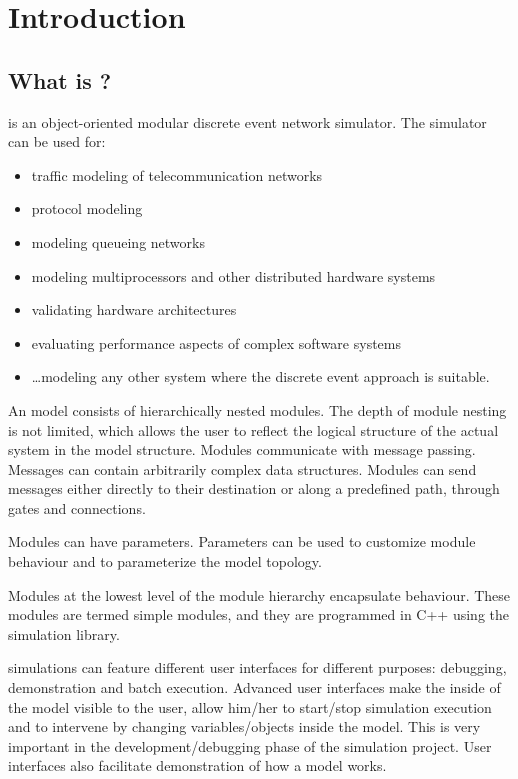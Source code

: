 \chapter{Introduction}
\label{cha:introduction}


\section{What is {\opp}?}

{\opp} is an object-oriented modular discrete event network simulator.
The simulator can be used for:

\begin{itemize}
  \item{traffic modeling of telecommunication networks}
  \item{protocol modeling}
  \item{modeling queueing networks}
  \item{modeling multiprocessors and other distributed hardware systems}
  \item{validating hardware architectures}
  \item{evaluating performance aspects of complex software systems}
  \item{\dots modeling any other system where the discrete event approach is
    suitable.}
\end{itemize}


An {\opp} model consists of hierarchically nested modules. The
depth of module nesting is not limited, which allows the user
to reflect the logical structure of the actual system in the
model structure. Modules communicate with message passing. Messages
can contain arbitrarily complex data structures. Modules can
send messages either directly to their destination or along a
predefined path, through gates and connections.


Modules can have parameters. Parameters can be used to customize
module behaviour and to parameterize the model topology.

Modules at the lowest level of the module hierarchy encapsulate
behaviour. These modules are termed simple modules, and they are
programmed in C++ using the simulation library.

{\opp} simulations can feature different user interfaces for
different purposes: debugging, demonstration and batch execution.
Advanced user interfaces make the inside of the model visible
to the user, allow him/her to start/stop simulation execution
and to intervene by changing variables/objects inside the model.
This is very important in the development/debugging phase
of the simulation project. User interfaces also facilitate demonstration
of how a model works.

